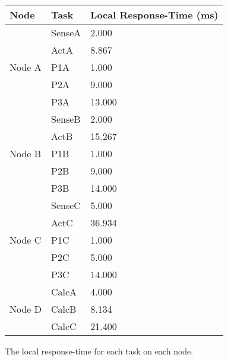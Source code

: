     \renewcommand{\arraystretch}{1.4}
    \begin{figure}[H]
    \centering
    \begin{minipage}{0.5\textwidth}
        \begin{table}[H]
        \centering
            \begin{tabular}{|l|l|l|}
            \hline
            \rowcolor{green!40}\textbf{Node} & \textbf{Task} & \textbf{Local Response-Time (ms)}   \\ \hline
            \multirow{5}{*}{Node A}     & SenseA    & 2.000 \\
                                        & ActA      & 8.867 \\ 
                                        & P1A       & 1.000 \\
                                        & P2A       & 9.000 \\
                                        & P3A       & 13.000 \\ \hline
            \multirow{5}{*}{Node B}     & SenseB    & 2.000 \\
                                        & ActB      & 15.267 \\ 
                                        & P1B       & 1.000 \\
                                        & P2B       & 9.000 \\
                                        & P3B       & 14.000 \\ \hline
            \multirow{5}{*}{Node C}     & SenseC    & 5.000 \\
                                        & ActC      & 36.934 \\ 
                                        & P1C       & 1.000 \\
                                        & P2C       & 5.000 \\
                                        & P3C       & 14.000 \\ \hline
            \multirow{3}{*}{Node D}     & CalcA     & 4.000 \\
                                        & CalcB     & 8.134 \\ 
                                        & CalcC     & 21.400 \\ \hline
            \end{tabular}
        \end{table}
    \end{minipage}
    \caption{The local response-time for each task on each node.}
    \label{fig:localresponse}
    \end{figure}
    \renewcommand{\arraystretch}{1.0}

